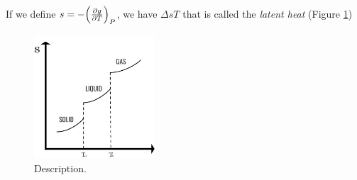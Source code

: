 \documentclass[../main/main.tex]{subfiles}
\begin{document}
If we define \( s=-\qty(\pdv{g}{T} )_P  \), we have \( \Delta s T \) that is called the \emph{latent heat} (Figure \ref{fig:2_4})
\begin{figure}[h!]
\centering
\includegraphics[width=0.4\textwidth]{../lessons/2_image/4.pdf}
\caption{\label{fig:2_4} Description.}
\end{figure}
\end{document}
